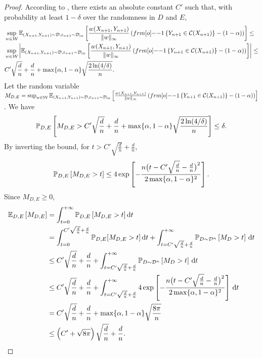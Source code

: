 \begin{proof}
According to , there exists an absolute constant $C'$ such that, with probability at least $1-\delta$ over the randomness in $D$ and $E$, 
\begin{align*}
    &\sup_{w\in\calW} \EE_{(X_{n+1},Y_{n+1}) \sim \calD, \varepsilon_{n+1} \sim \calD_{\text{rn}}}\qth{\frac{w(X_{n+1},Y_{n+1})}{\|w\|_{\infty}}\pth{\11\sth{Y_{n+1} \in \calC(X_{n+1})}- (1-\alpha)}} \leq \\
    &\sup_{w\in\calW} \left|\EE_{(X_{n+1},Y_{n+1}) \sim \calD, \varepsilon_{n+1} \sim \calD_{\text{rn}}}\qth{\frac{w(X_{n+1},Y_{n+1})}{\|w\|_{\infty}}\pth{\11\sth{Y_{n+1} \in \calC(X_{n+1})}- (1-\alpha)}} \right| \leq \\
    & C' \sqrt{\frac{d}{n}} + \frac{d}{n} +\max \{\alpha, 1-\alpha\}\sqrt{\frac{2\ln(4/\delta)}{n}}.
\end{align*}
Let the random variable $M_{D,E} = \sup_{w\in\calW} \EE_{(X_{n+1},Y_{n+1}) \sim \calD, \varepsilon_{n+1} \sim \calD_{\text{rn}}}\qth{\frac{w(X_{n+1},Y_{n+1})}{\|w\|_{\infty}}\pth{\11\sth{Y_{n+1} \in \calC(X_{n+1})}- (1-\alpha)}}$. We have 
\begin{align*}
    \mathbb{P}_{D,E}\left[ M_{D,E} >  C' \sqrt{\frac{d}{n}} + \frac{d}{n} + \max\{\alpha, 1 - \alpha\} \sqrt{\frac{2 \ln(4/\delta)}{n}}  \right] \leq \delta.
\end{align*}
By inverting the bound, for $t>C' \sqrt{\frac{d}{n}} + \frac{d}{n}$,
\begin{align*}
    \mathbb{P}_{D,E}\left[ M_{D,E} > t \right] \leq  4 \mathop{\rm exp}\left[-\frac{n \big(t - C' \sqrt{\frac{d}{n}} - \frac{d}{n}   \big)^2}{2 \max\{\alpha, 1 - \alpha\}^2}\right].
\end{align*}
Since $M_{D,E} \geq 0$, 
\begin{align*}
    \mathbb{E}_{D,E}\left[ M_{D,E} \right] &= \int_{t=0}^{+\infty} \mathbb{P}_{D,E}\left[ M_{D,E}>t \right] \mathrm{d}t \\
    &= \int_{t=0}^{C' \sqrt{\frac{d}{n}} + \frac{d}{n}} \mathbb{P}_{D,E}[M_{D,E} > t] \, \mathrm{d}t + \int_{t=C' \sqrt{\frac{d}{n}} + \frac{d}{n}}^{+\infty} \mathbb{P}_{D\sim{\cal D}^n}\left[ M_D > t \right] \, \mathrm{d}t \\
    &\leq C' \sqrt{\frac{d}{n}} + \frac{d}{n} + \int_{t=C' \sqrt{\frac{d}{n}} + \frac{d}{n}}^{+\infty} \mathbb{P}_{D\sim{\cal D}^n}\left[ M_D > t \right]\, \mathrm{d}t \\
    &\leq  C' \sqrt{\frac{d}{n}} + \frac{d}{n} + \int_{t=C' \sqrt{\frac{d}{n}} + \frac{d}{n}}^{+\infty} 4 \mathop{\rm exp}\left[-\frac{n \big(t - C' \sqrt{\frac{d}{n}} - \frac{d}{n}   \big)^2}{2 \max\{\alpha, 1 - \alpha\}^2}\right] \, \mathrm{d}t \\
    &= C' \sqrt{\frac{d}{n}} + \frac{d}{n} + \max\{\alpha, 1 - \alpha\} \sqrt{\frac{8\pi}{n}} \\
    &\leq \left( C' +\sqrt{8\pi}  \right)  \sqrt{\frac{d}{n}} + \frac{d}{n}.
\end{align*}
\end{proof}


